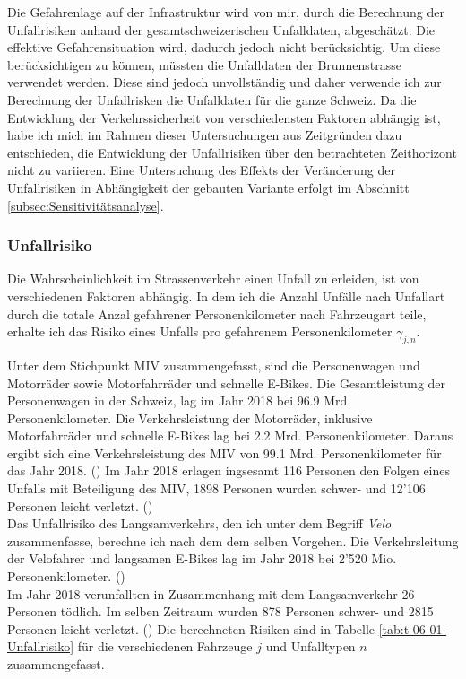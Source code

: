 Die Gefahrenlage auf der Infrastruktur wird von mir, durch die Berechnung der Unfallrisiken anhand der gesamtschweizerischen Unfalldaten, abgeschätzt.
Die effektive Gefahrensituation wird, dadurch jedoch nicht berücksichtig. Um diese berücksichtigen zu können, müssten die Unfalldaten der Brunnenstrasse verwendet werden. Diese sind jedoch unvollständig und daher verwende ich zur Berechnung der Unfallrisken die Unfalldaten für die ganze Schweiz. 
Da die Entwicklung der Verkehrssicherheit von verschiedensten Faktoren abhängig ist, habe ich mich im Rahmen dieser Untersuchungen aus Zeitgründen dazu entschieden, die Entwicklung der Unfallrisiken über den betrachteten Zeithorizont nicht zu variieren. 
Eine Untersuchung des Effekts der Veränderung der Unfallrisiken in Abhängigkeit der gebauten Variante erfolgt im Abschnitt \ref{subsec:Sensitivitätsanalyse}.


\subsubsection*{Unfallrisiko}
\label{subsubsec:Unfallrisiko}


Die Wahrscheinlichkeit im Strassenverkehr einen Unfall zu erleiden, ist von verschiedenen Faktoren abhängig. In dem ich die Anzahl Unfälle nach Unfallart durch die totale Anzal gefahrener Personenkilometer nach Fahrzeugart teile, erhalte ich das Risiko eines Unfalls pro gefahrenem Personenkilometer \( \gamma_{j,n} \). 

Unter dem Stichpunkt MIV zusammengefasst, sind die Personenwagen und Motorräder sowie Motorfahrräder und schnelle E-Bikes. Die Gesamtleistung der Personenwagen in der Schweiz, lag im Jahr 2018 bei 96.9 Mrd. Personenkilometer. Die Verkehrsleistung der Motorräder, inklusive Motorfahrräder und schnelle E-Bikes lag bei 2.2 Mrd. Personenkilometer. Daraus ergibt sich eine Verkehrsleistung des MIV von 99.1 Mrd. Personenkilometer für das Jahr 2018. (\cite{Verkehrsleistung2019})
Im Jahr 2018 erlagen ingsesamt 116 Personen den Folgen eines Unfalls mit Beteiligung des MIV, 1898 Personen wurden schwer- und 12'106 Personen leicht verletzt. (\cite{Unfall2019})\\

Das Unfallrisiko des Langsamverkehrs, den ich unter dem Begriff \textit{Velo} zusammenfasse, berechne ich nach dem dem selben Vorgehen.
Die Verkehrsleitung der Velofahrer und langsamen E-Bikes lag im Jahr 2018 bei 2'520 Mio. Personenkilometer. (\cite{Verkehrsleistung2019}) \\
Im Jahr 2018 verunfallten in Zusammenhang mit dem Langsamverkehr 26 Personen tödlich. Im selben Zeitraum wurden 878 Personen schwer- und 2815 Personen leicht verletzt. (\cite{Unfall2019})
Die berechneten Risiken sind in Tabelle \ref{tab:t-06-01-Unfallrisiko} für die verschiedenen Fahrzeuge $j$ und Unfalltypen $n$ zusammengefasst.

